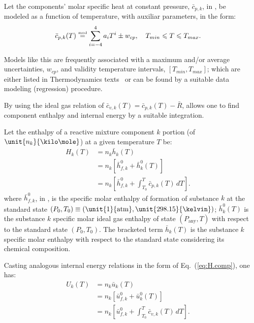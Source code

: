     Let the components' molar specific heat at constant pressure, $\bar{c}_{p,k}$, in  \kilo\joule\per\kilo\mole\usk\kelvin,  be
    modeled as a function of temperature, with auxiliar parameters, in the form:%
    \begin{equation}
        \bar{c}_{p,k}(T) \stackrel{\text{{\tiny mod}}}{=} \sum_{i=-4}^4 a_iT^i \pm w_{cp}, \quad T_{min} \leqslant T \leqslant T_{max}.
        \label{eq:cp}
    \end{equation}

    Models like this are frequently associated with a maximum and/or average uncertainties, $w_{cp}$, and  validity  temperature
    intervals, $[T_{min}, T_{max}]$; which are either  listed  in  Thermodynamics  texts~\cite{2014-CengelYA+BolesMA-McGrawHill,
    1985-WylenG-Wiley} or can be found by a suitable data modeling (regression) procedure.

    By using the ideal gas relation of $\bar{c}_{v,k}(T) = \bar{c}_{p,k}(T) - \bar{R}$, allows one to  find  component  enthalpy
    and internal energy by a suitable integration.

    Let the enthalpy of a reactive mixture component $k$ portion (of $\unit{n_k}{\kilo\mole}$) at a given temperature $T$ be:%
    \begin{align}
        H_k(T)      &= n_k\bar{h}_k(T) \nonumber\\
                    &= n_k[\bar{h}^0_{f,k} + \bar{h}^0_k(T)] \nonumber\\
                    &= n_k\left[
                        \bar{h}^0_{f,k} + \int_{T_0}^T \bar{c}_{p,k}(T)\,dT
                    \right].
        \label{eq:H.comp}
    \end{align}
    \noindent where $\bar{h}^0_{f,k}$, in \kilo\joule\per\kilo\mole, is the specific molar enthalpy of formation of  substance  $k$
    at the standard  state  $(P_0,  T_0)  \equiv  (\unit{1}{\mathrm{atm}},  \unit{298.15}{\kelvin})$;  $\bar{h}^0_k(T)$  is  the
    substance $k$ specific molar ideal gas enthalpy of state $(P_{\mathrm{any}}, T)$ with respect to the standard  state  $(P_0,
    T_0)$. The bracketed term $\bar{h}_k(T)$ is the substance $k$ specific molar enthalpy with respect  to  the  standard  state
    considering its chemical composition.

    Casting analogous internal energy relations in the form of Eq.~(\ref{eq:H.comp}), one has:%
    \begin{align}
        U_k(T)      &= n_k\bar{u}_k(T) \nonumber\\
                    &= n_k[\bar{u}^0_{f,k} + \bar{u}^0_k(T)] \nonumber\\
                    &= n_k\left[
                        \bar{u}^0_{f,k} + \int_{T_0}^T \bar{c}_{v,k}(T)\,dT
                    \right].
        \label{eq:U.comp}
    \end{align}

